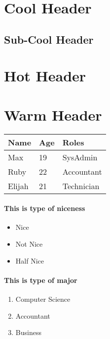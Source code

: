 \documentclass{book}
\begin{document}
  \pagestyle{fancy}
  \fancyhead[RO, RE]{\thepage}
  \fancyfoot[CO, CE]{}
  
  \section*{Cool Header}
  \blindtext[1]
  \subsection*{Sub-Cool Header}
  \begin{multicols}{2}
    \blindtext[2]
  \end{multicols}
  \section*{Hot Header}
  \blindtext[2]
  \section*{Warm Header}
  \blindtext
   
  \begin{multicols}{2}
    \blindtext[10] 
  \end{multicols}
  \begin{center}
    \begin{tabular}{ | m{2cm} | m{2cm} | m{2cm} | }
    \hline
      Name & Age & Roles \\
      \hline
      Max & 19 & SysAdmin \\
      \hline
      Ruby & 22 & Accountant \\
      \hline
      Elijah & 21 & Technician \\
      \hline
    \end{tabular}
  \end{center}

  \paragraph{This is type of niceness}
  \begin{itemize}
    \item Nice
    \item Not Nice
    \item Half Nice
  \end{itemize}
  
  \paragraph{This is type of major}
  \begin{enumerate}
    \item Computer Science
    \item Accountant
    \item Business
  \end{enumerate}
\end{document}
